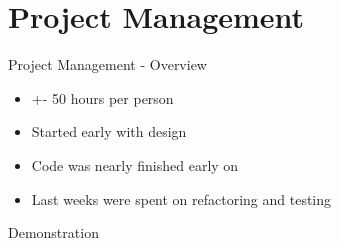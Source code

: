 \documentclass[10pt]{beamer}
\begin{document}
\section{Project Management}
%

\begin{frame}[fragile]{Project Management - Overview}
\begin{itemize}
\item +- 50 hours per person
\item Started early with design
\item Code was nearly finished early on
\item Last weeks were spent on refactoring and testing
\end{itemize}
\end{frame}

{
\begin{frame}[standout]
  Demonstration
\end{frame}
}
\end{document}
